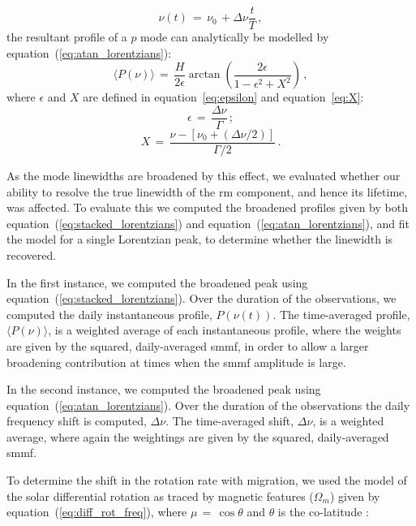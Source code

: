 \begin{equation}
\nu(t) \, = \, \nu_0 \, +  \Delta\nu \frac{t}{T} \, ,
\label{eq:linear_variation}
\end{equation}
%
the resultant profile of a $p$ mode can analytically be modelled by equation~(\ref{eq:atan_lorentzians}):
%
\begin{equation}
\langle P(\nu) \rangle \, = \, \frac{H}{2\epsilon} \arctan \left( \frac{2 \epsilon}{1 - \epsilon^2 + X^2 } \right) \, ,
\label{eq:atan_lorentzians}
\end{equation}
%
where $\epsilon$ and $X$ are defined in equation~\ref{eq:epsilon} and equation~\ref{eq:X}:
%
\begin{equation}
\epsilon \, = \, \frac{\Delta\nu}{\Gamma} \, ;
\label{eq:epsilon}
\end{equation}
%
\begin{equation}
X \, = \, \frac{\nu - [\nu_0 + (\Delta\nu/2)]}{\Gamma /2} \, .
\label{eq:X}
\end{equation}

As the mode linewidths are broadened by this effect, we evaluated whether our ability to resolve the true linewidth of the \gls{rm} component, and hence its lifetime, was affected. To evaluate this we computed the broadened profiles given by both equation~(\ref{eq:stacked_lorentzians}) and equation~(\ref{eq:atan_lorentzians}), and fit the model for a single Lorentzian peak, to determine whether the linewidth is recovered.

In the first instance, we computed the broadened peak using equation~(\ref{eq:stacked_lorentzians}). Over the duration of the observations, we computed the daily instantaneous profile, $P(\nu(t))$. The time-averaged profile, $ \langle P(\nu) \rangle$, is a weighted average of each instantaneous profile, where the weights are given by the squared, daily-averaged \gls{smmf}, in order to allow a larger broadening contribution at times when the \gls{smmf} amplitude is large.

In the second instance, we computed the broadened peak using equation~(\ref{eq:atan_lorentzians}). Over the duration of the observations the daily frequency shift is computed, $\Delta\nu$. The time-averaged shift, $\Delta\nu$, is a weighted average, where again the weightings are given by the squared, daily-averaged \gls{smmf}.

To determine the shift in the rotation rate with migration, we used the model of the solar differential rotation as traced by magnetic features ($\Omega_m$) given by equation~(\ref{eq:diff_rot_freq}), where $\mu\,=\,\cos\theta$ and $\theta$ is the co-latitude \citep{snodgrass_magnetic_1983, brown_inferring_1989}:

